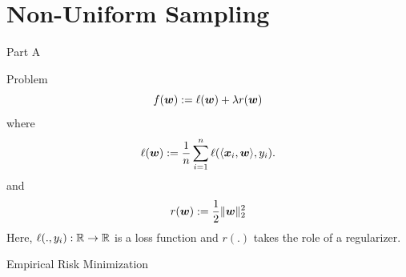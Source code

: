 \section{Non-Uniform Sampling}
\begin{frame}{Part A}
\Large \center{\color{blue}{ Non-Uniform Sampling Algorithms}}
\end{frame}

\begin{frame}{Problem}
\begin{equation}
    \label{eq:primalObjective}
    f(\bm{w}):= \ell(\bm{w})+\lambda r(\bm{w})
\end{equation}
where 
\begin{equation}\label{eq:someEquationName}
    \ell(\bm{w}) := \frac1n \sum_{i=1}^n \ell(\langle \bm{x}_i, \bm{w} \rangle, y_i).
\end{equation}
and 
\begin{equation}
    r(\bm{w}) := \frac12 \|\bm{w}\|_2^2
\end{equation}
Here, $\ell(.,y_i):\mathbb{R}\rightarrow\mathbb{R}$ is a loss function and $r(.)$ takes the role of a regularizer. 
\begin{block}{Empirical Risk Minimization}
\end{block}
\end{frame}

